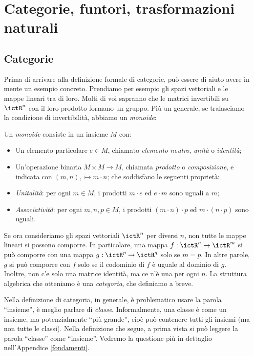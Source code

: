 \chapter{Categorie, funtori, trasformazioni naturali}

\section{Categorie}\label{categorie}

Prima di arrivare alla definizione formale di categorie, può essere di aiuto avere in mente un esempio concreto. Prendiamo per esempio gli spazi vettoriali e le mappe lineari tra di loro. 
Molti di voi sapranno che le matrici invertibili su $\ictR^n$ con il loro prodotto formano un gruppo. Più un generale, se tralasciamo la condizione di invertibilità, abbiamo un \emph{monoide}:

\begin{definition}
 Un \emph{monoide} consiste in un insieme $M$ con:
 \begin{itemize}
  \item Un elemento particolare $e\in M$, chiamato \emph{elemento neutro}, \emph{unità} o \emph{identità};
  \item Un'operazione binaria $M\times M\to M$, chiamata \emph{prodotto} o \emph{composizione}, e indicata con $(m,n),\mapsto m\cdot n$;
  che soddisfano le seguenti proprietà:
  \item \emph{Unitalità}: per ogni $m\in M$, i prodotti $m \cdot e$ ed $e\cdot m$ sono uguali a $m$;
  \item \emph{Associatività}: per ogni $m,n,p\in M$, i prodotti $(m\cdot n)\cdot p$ ed $m\cdot (n\cdot p)$ sono uguali. 
 \end{itemize}
\end{definition}

Se ora consideriamo gli spazi vettoriali $\ictR^n$ per diversi $n$, non tutte le mappe lineari si possono comporre. In particolare, una mappa $f:\ictR^n\to \ictR^m$ si può comporre con una mappa $g:\ictR^p\to\ictR^q$ solo se $m=p$. In altre parole, $g$ si può comporre con $f$ solo se il codominio di $f$ è uguale al dominio di $g$.
Inoltre, non c'e solo una matrice identità, ma ce n'è una per ogni $n$. 
La struttura algebrica che otteniamo è una \emph{categoria}, che definiamo a breve.

Nella definizione di categoria, in generale, è problematico usare la parola ``insieme'', è meglio parlare di \emph{classe}. Informalmente, una classe è come un insieme, ma potenzialmente ``più grande'', cioè può contenere tutti gli insiemi (ma non tutte le classi). 
Nella definizione che segue, a prima vista si può leggere la parola ``classe'' come ``insieme''. Vedremo la questione più in dettaglio nell'Appendice \ref{fondamenti}. 

